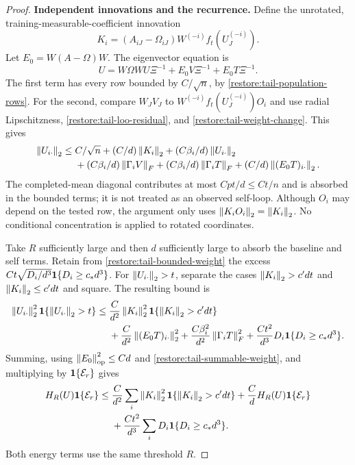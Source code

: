 \begin{proof}
\medskip\noindent\textbf{Independent innovations and the recurrence.}
Define the unrotated, training-measurable-coefficient innovation
\begin{equation}
 K_i=(A_{iJ}-\Omega_{iJ})W^{(-i)}f_t(U_J^{(-i)}).
 \label{restore:tail-innovation}
\end{equation}
Let $E_0=W(A-\Omega)W$.
The eigenvector equation is
\[
 U=W\Omega WU\Xi^{-1}+E_0V\Xi^{-1}+E_0T\Xi^{-1}.
\]
The first term has every row bounded by $C/\sqrt n$, by
\eqref{restore:tail-population-rows}.
For the second, compare $W_JV_J$ to
$W^{(-i)}f_t(U_J^{(-i)})O_i$ and use radial Lipschitzness,
\eqref{restore:tail-loo-residual}, and
\eqref{restore:tail-weight-change}.  This gives
\begin{align}
 \left\lVert U_{i\cdot}\right\rVert_2\le{}&
 C/\sqrt n+(C/d)\left\lVert K_i\right\rVert_2
 +(C\beta_i/d)\left\lVert U_{i\cdot}\right\rVert_2\nonumber\\
 &+(C\beta_i/d)\left\lVert\Gamma_iV\right\rVert_F
 +(C\beta_i/d)\left\lVert\Gamma_iT\right\rVert_F
 +(C/d)\left\lVert(E_0T)_{i\cdot}\right\rVert_2.
 \label{restore:tail-row-recursion}
\end{align}
The completed-mean diagonal contributes at most $Cpt/d\le Ct/n$
and is absorbed in the bounded terms; it is not treated as an
observed self-loop.
Although $O_i$ may depend on the tested row, the argument only uses
$\left\lVert K_iO_i\right\rVert_2=\left\lVert K_i\right\rVert_2$.
No conditional concentration is applied to rotated coordinates.

Take $R$ sufficiently large and then $d$ sufficiently large to absorb
the baseline and self terms.  Retain from
\eqref{restore:tail-bounded-weight} the excess
$Ct\sqrt{D_i/d^3}\mathbf1\{D_i\ge c_*d^3\}$.
For $\left\lVert U_{i\cdot}\right\rVert_2>t$, separate the cases
$\left\lVert K_i\right\rVert_2>c'dt$ and $\left\lVert K_i\right\rVert_2\le c'dt$ and square.
The resulting bound is
\begin{align}
 \left\lVert U_{i\cdot}\right\rVert_2^2\mathbf1\{\left\lVert U_{i\cdot}\right\rVert_2>t\}
 \le{}&\frac C{d^2}\left\lVert K_i\right\rVert_2^2
                         \mathbf1\{\left\lVert K_i\right\rVert_2>c'dt\}\nonumber\\
 &+\frac C{d^2}\left\lVert(E_0T)_{i\cdot}\right\rVert_2^2
 +\frac{C\beta_i^2}{d^2}\left\lVert\Gamma_iT\right\rVert_F^2
 +\frac{Ct^2}{d^3}D_i\mathbf1\{D_i\ge c_*d^3\}.
 \label{restore:tail-pointwise-recursion}
\end{align}
Summing, using $\left\lVert E_0\right\rVert_{\mathrm{op}}^2\le Cd$ and
\eqref{restore:tail-summable-weight}, and multiplying by
$\mathbf1\{\mathcal E_r\}$ gives
\begin{align}
 H_R(U)\mathbf1\{\mathcal E_r\}
 \le{}&\frac C{d^2}\sum_i\left\lVert K_i\right\rVert_2^2
                         \mathbf1\{\left\lVert K_i\right\rVert_2>c'dt\}
 +\frac CdH_R(U)\mathbf1\{\mathcal E_r\}\nonumber\\
 &+\frac{Ct^2}{d^3}\sum_iD_i\mathbf1\{D_i\ge c_*d^3\}.
 \label{restore:tail-energy-recursion}
\end{align}
Both energy terms use the same threshold $R$.


\end{proof}
